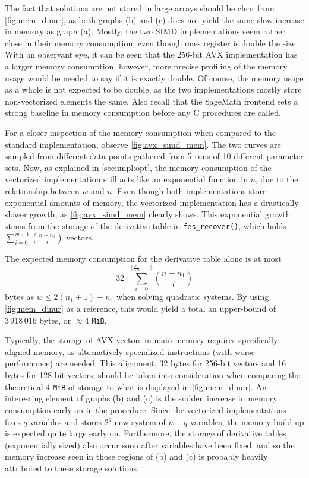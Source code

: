 The fact that solutions are not stored in large arrays should be clear from \cref{fig:mem_dinur}, as both graphs (b) and (c) does not yield the same slow increase in memory as graph (a). Mostly, the two SIMD implementations seem rather close in their memory consumption, even though ones register is double the size. With an observant eye, it can be seen that the 256-bit AVX implementation has a larger memory consumption, however, more precise profiling of the memory usage would be needed to say if it is exactly double. Of course, the memory usage as a whole is not expected to be double, as the two implementations mostly store non-vectorized elements the same. Also recall that the SageMath frontend sets a strong baseline in memory consumption before any C procedures are called. 

For a closer inspection of the memory consumption when compared to the standard implementation, observe \cref{fig:avx_simd_mem}. The two curves are sampled from different data points gathered from 5 runs of 10 different parameter sets. Now, as explained in \cref{sec:impl:opt}, the memory consumption of the vectorized implementation still acts like an exponential function in $n$, due to the relationship between $w$ and $n$. Even though both implementations store exponential amounts of memory, the vectorized implementation has a drastically slower growth, as \cref{fig:avx_simd_mem} clearly shows. This exponential growth stems from the storage of the derivative table in \texttt{fes\_recover()}, which holds $\sum_{i = 0}^{w + 1} \binom{n - n_1}{i}$ vectors.

The expected memory consumption for the derivative table alone is at most 
$$
    32 \cdot \sum_{i = 0}^{\lceil \frac{n}{5.4} \rceil + 3} \binom{n - n_1}{i}
$$
bytes as $w \leq 2 (n_1 + 1) - n_1$ when solving quadratic systems. By using \cref{fig:mem_dinur} as a reference, this would yield a total an upper-bound of $3\,918\,016$ bytes, or $\approx 4$ \texttt{MiB}. 

Typically, the storage of AVX vectors in main memory requires specifically aligned memory, as alternatively specialized instructions (with worse performance) are needed. This alignment, 32 bytes for 256-bit vectors and 16 bytes for 128-bit vectors, should be taken into consideration when comparing the theoretical $4$ \texttt{MiB} of storage to what is displayed in \cref{fig:mem_dinur}. An interesting element of graphs (b) and (c) is the sudden increase in memory consumption early on in the procedure. Since the vectorized implementations fixes $q$ variables and stores $2^q$ new system of $n - q$ variables, the memory build-up is expected quite large early on. Furthermore, the storage of derivative tables (exponentially sized) also occur soon after variables have been fixed, and so the memory increase seen in those regions of (b) and (c) is probably heavily attributed to these storage solutions. 

